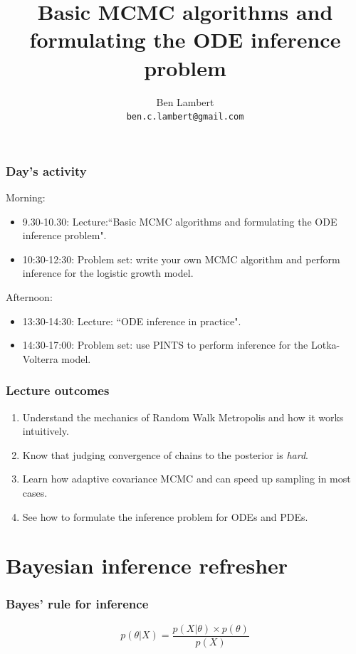 \documentclass[handout]{beamer}
\title{Basic MCMC algorithms and formulating the ODE inference problem}
\author[Ben Lambert]{Ben Lambert\inst{1}\\ \texttt{ben.c.lambert@gmail.com}}
\date{\displaydate{date}}
\institute[University of Oxford]{
	\inst{1}University of Oxford}
\begin{document}
\begin{frame}
\titlepage
\end{frame}


\begin{frame}
	\frametitle{Day's activity}
	
	Morning:
	
	\begin{itemize}
		\item 9.30-10.30: Lecture:``Basic MCMC algorithms and formulating the ODE inference problem".
		\item 10:30-12:30: Problem set: write your own MCMC algorithm and perform inference for the logistic growth model.
	\end{itemize}
	
	Afternoon:
	
	\begin{itemize}
		\item 13:30-14:30: Lecture: ``ODE inference in practice".
		\item 14:30-17:00: Problem set: use PINTS to perform inference for the Lotka-Volterra model.
	\end{itemize}
	
\end{frame}


\begin{frame}
\frametitle{Lecture outcomes}

\begin{enumerate}
\item Understand the mechanics of Random Walk Metropolis and how it works intuitively.
\item Know that judging convergence of chains to the posterior is \textit{hard}.
\item Learn how adaptive covariance MCMC and can speed up sampling in most cases.
\item See how to formulate the inference problem for ODEs and PDEs.
\end{enumerate}

\end{frame}

\section{Bayesian inference refresher}
\frame{\tableofcontents[currentsection]}

\begin{frame}
	\frametitle{Bayes' rule for inference}
	
	
	\Large
	\begin{equation}
	p(\theta|X) = \frac{p(X|\theta)\times p(\theta)}{p(X)}
	\end{equation}
	
\end{frame}
\end{document}
